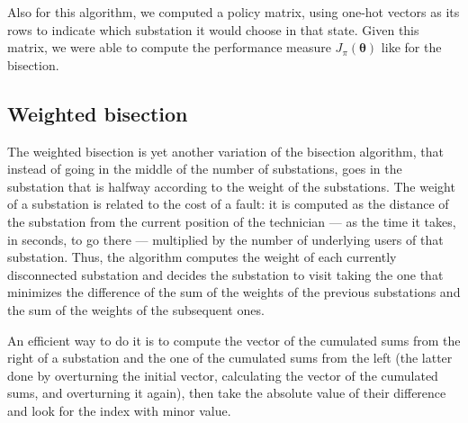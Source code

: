 Also for this algorithm, we computed a policy matrix, using one-hot vectors as its rows to indicate which substation it would choose in that state. Given this matrix, we were able to compute the performance measure $J_\pi(\boldsymbol \theta)$ like for the bisection.


\subsection{Weighted bisection}

The weighted bisection is yet another variation of the bisection algorithm, that instead of going in the middle of the number of substations, goes in the substation that is halfway according to the weight of the substations. The weight of a substation is related to the cost of a fault: it is computed as the distance of the substation from the current position of the technician --- as the time it takes, in seconds, to go there --- multiplied by the number of underlying users of that substation. Thus, the algorithm computes the weight of each currently disconnected substation and decides the substation to visit taking the one that minimizes the difference of the sum of the weights of the previous substations and the sum of the weights of the subsequent ones.

An efficient way to do it is to compute the vector of the cumulated sums from the right of a substation and the one of the cumulated sums from the left (the latter done by overturning the initial vector, calculating the vector of the cumulated sums, and overturning it again), then take the absolute value of their difference and look for the index with minor value.